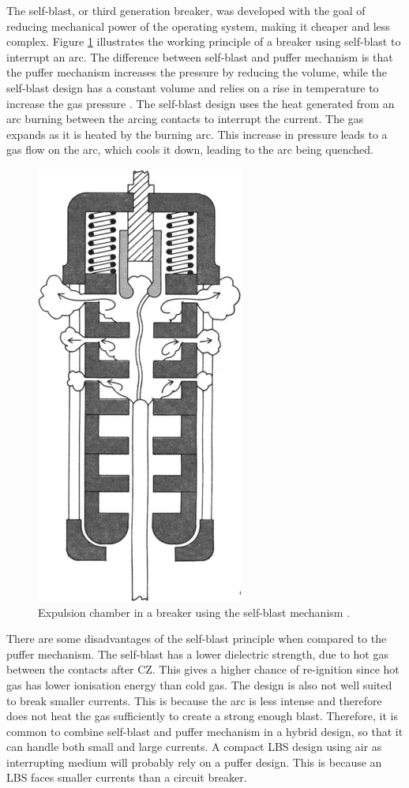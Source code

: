 \documentclass[10pt,b5paper,twoside]{article}
\begin{document}
The self-blast, or third generation breaker, was developed with the goal of reducing mechanical power of the operating system, making it cheaper and less complex. Figure \ref{fig:selfBlast} illustrates the working principle of a breaker using self-blast to interrupt an arc. The difference between self-blast and puffer mechanism is that the puffer mechanism increases the pressure by reducing the volume, while the self-blast design has a constant volume and relies on a rise in temperature to increase the gas pressure \cite{bib:CBAC}. The self-blast design uses the heat generated from an arc burning between the arcing contacts to interrupt the current. The gas expands as it is heated by the burning arc. This increase in pressure leads to a gas flow on the arc, which cools it down, leading to the arc being quenched.

\begin{figure} [H]
\centering
\includegraphics[scale=0.33]{Bilder/Theory/selfBlast.png}
\caption{Expulsion chamber in a breaker using the self-blast mechanism \cite{bib:CBAC}.} \label{fig:selfBlast}
\end{figure}

There are some disadvantages of the self-blast principle when compared to the puffer mechanism. The self-blast has a lower dielectric strength, due to hot gas between the contacts after CZ. This gives a higher chance of re-ignition since hot gas has lower ionisation energy than cold gas. The design is also not well suited to break smaller currents. This is because the arc is less intense and therefore does not heat the gas sufficiently to create a strong enough blast. Therefore, it is common to combine self-blast and puffer mechanism in a hybrid design, so that it can handle both small and large currents. A compact LBS design using air as interrupting medium will probably rely on a puffer design. This is because an LBS faces smaller currents than a circuit breaker.
\end{document}
